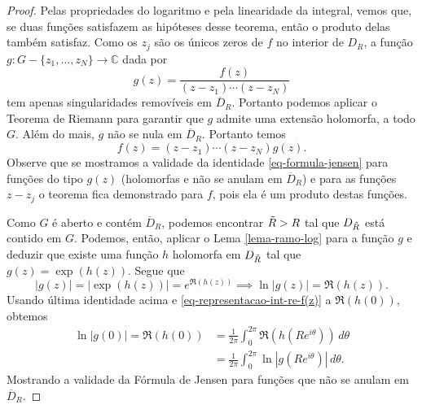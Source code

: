     \begin{proof}
        Pelas propriedades do logaritmo e pela linearidade da integral, vemos que, 
        se duas funções satisfazem as hipóteses desse teorema, então o produto delas
        também satisfaz. Como os $z_j$ são os únicos zeros de $f$ no interior de
        $D_R$, a função $g:G -\{z_1, \dots, z_N\}\to \mathbb{C}$ dada por
        \begin{equation*}
            g(z) = \frac{f(z)}{(z-z_1) \cdots (z-z_N)}
        \end{equation*}
        tem apenas singularidades removíveis em $\overline{D}_R$. 
        Portanto podemos aplicar o Teorema de Riemann para
        garantir que $g$ admite uma extensão holomorfa, a todo $G$.  
        Além do mais, $g$ não se nula em $\overline{D}_R$. 
        Portanto temos
        \begin{equation*}
            f(z) = (z-z_1)\cdots(z-z_N)g(z).
        \end{equation*}
        Observe que se mostramos a validade da identidade
        \eqref{eq-formula-jensen} para funções do tipo $g(z)$ 
        (holomorfas e não se anulam em $\overline{D}_R$) e para as funções $z-z_j$ 
        o teorema fica demonstrado para $f$, pois ela é um produto destas funções.
        
        Como $G$ é aberto e contém $\overline{D}_R$, podemos encontrar $\Tilde{R}>R$
        tal que $D_{\Tilde{R}}$ está contido em $G$. Podemos, então, aplicar o 
        Lema \ref{lema-ramo-log} para a função $g$ e deduzir que existe uma função
        $h$ holomorfa em $D_{\Tilde{R}}$ tal que $g(z) = \exp(h(z))$. Segue que
        \begin{equation*}
            |g(z)| = |\exp(h(z))| = e^{\Re{(h(z))}} 
            \implies \ln{|g(z)|} = \Re{(h(z))}.
        \end{equation*}
        Usando última identidade acima e \eqref{eq-representacao-int-re-f(z)}
        a $\Re{(h(0))}$, obtemos 
        \begin{align*}
            \ln{|g(0)|} = \Re(h(0)) &= \frac{1}{2\pi} 
            \int_{0}^{2\pi}\Re{(h(Re^{i\theta}))} \, d\theta \\
            &= \frac{1}{2\pi}\int_{0}^{2\pi}\ln{|g(Re^{i\theta})|} \, d\theta.
        \end{align*}
        Mostrando a validade da Fórmula de Jensen para
        funções que não se anulam em $\overline{D}_R$.
        

\end{proof}
